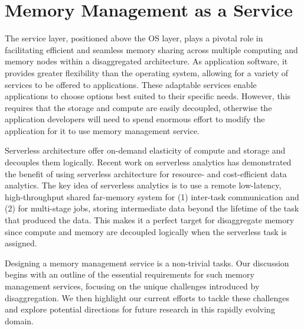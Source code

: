 \chapter{Memory Management as a Service}
\label{chap:service}



The service layer, positioned above the OS layer, plays a pivotal role in facilitating efficient and seamless memory sharing across multiple computing and memory nodes within a disaggregated architecture. As application software, it provides greater flexibility than the operating system, allowing for a variety of services to be offered to applications. These adaptable services enable applications to choose options best suited to their specific needs. However, this requires that the storage and compute are easily decoupled, otherwise the application developers will need to spend enormous effort to modify the application for it to use memory management service. 

Serverless architecture offer on-demand elasticity of compute and storage and decouples them logically. Recent work on serverless analytics has demonstrated the benefit of using serverless architecture for resource- and cost-efficient data analytics. The key idea of serverless analytics is to use a remote low-latency, high-throughput shared far-memory system for (1) inter-task communication and (2) for multi-stage jobs, storing intermediate data beyond the lifetime of the task that produced the data. This makes it a perfect target for disaggregate memory since compute and memory are decoupled logically when the serverless task is assigned.

Designing a memory management service is a non-trivial tasks. Our discussion begins with an outline of the essential requirements for such memory management services, focusing on the unique challenges introduced by disaggregation. We then highlight our current efforts to tackle these challenges and explore potential directions for future research in this rapidly evolving domain.


